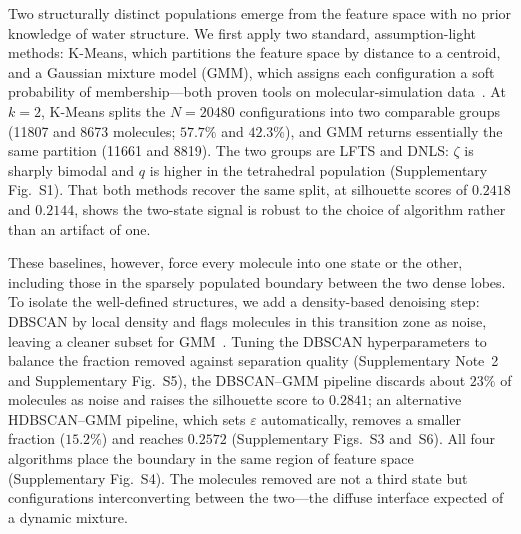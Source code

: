 \documentclass[aps, amsmath,amssymb, reprint, twocolumn, superscriptaddress]{revtex4-2}
\newcommand{\edit}[1]{\textcolor{OrangeRed}{#1}}
\begin{document}
Two structurally distinct populations emerge from the feature space with no prior knowledge of water structure. We first apply two standard, assumption-light methods: K-Means, which partitions the feature space by distance to a centroid, and a Gaussian mixture model (GMM), which assigns each configuration a soft probability of membership---both proven tools on molecular-simulation data~\cite{shao_clustering_2007, westerlund_inflecs_2019}. At $k = 2$, K-Means splits the $N = 20480$ configurations into two comparable groups (11807 and 8673 molecules; $57.7\%$ and $42.3\%$), and GMM returns essentially the same partition (11661 and 8819). The two groups are LFTS and DNLS: $\zeta$ is sharply bimodal and $q$ is higher in the tetrahedral population (Supplementary Fig.~S1). That both methods recover the same split, at silhouette scores of $0.2418$ and $0.2144$, shows the two-state signal is robust to the choice of algorithm rather than an artifact of one.


These baselines, however, force every molecule into one state or the other, including those in the sparsely populated boundary between the two dense lobes. To isolate the well-defined structures, we add a density-based denoising step: DBSCAN \edit{} by local density and flags molecules in this transition zone as noise, leaving a cleaner subset for GMM~\cite{ester_density-based_1996}. Tuning the DBSCAN hyperparameters to balance the fraction removed against separation quality (Supplementary Note~2 and Supplementary Fig.~S5), the DBSCAN--GMM pipeline discards about $23\%$ of molecules as noise and raises the silhouette score to $0.2841$; an alternative HDBSCAN--GMM pipeline, which sets $\varepsilon$ automatically, removes a smaller fraction ($15.2\%$) and reaches $0.2572$ (Supplementary Figs.~S3 and~S6). All four algorithms place the boundary in the same region of feature space (Supplementary Fig.~S4). The molecules removed are not a third state but configurations interconverting between the two---the diffuse interface expected of a dynamic mixture.
\end{document}
